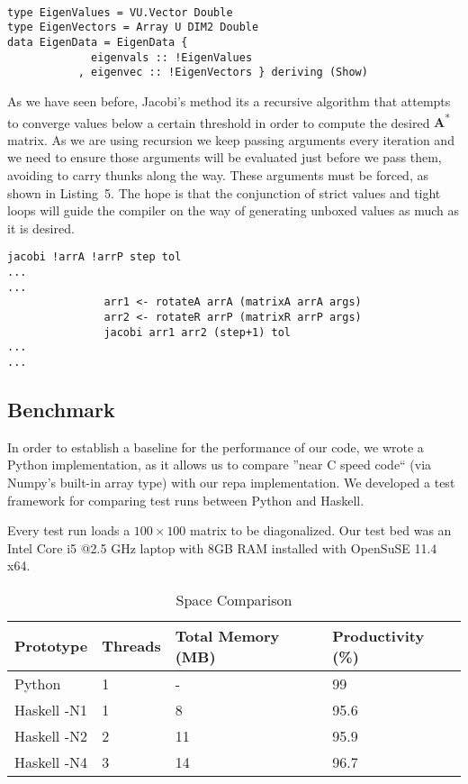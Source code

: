 \documentclass{tmr}
\begin{document}
\begin{lstlisting}[float,captionpos=b,belowcaptionskip=4pt, caption= Strict data types for eigenvalue operations]

type EigenValues = VU.Vector Double
type EigenVectors = Array U DIM2 Double
data EigenData = EigenData {
             eigenvals :: !EigenValues
           , eigenvec :: !EigenVectors } deriving (Show)

\end{lstlisting}

As we have seen before, Jacobi's method its a recursive algorithm that
attempts to converge values below a certain threshold in order to
compute the desired {\textbf A\textsuperscript{*}} matrix.  As we are
using recursion we keep passing arguments every iteration and we need to
ensure those arguments will be evaluated just before we pass them,
avoiding to carry thunks along the way. These arguments must be forced,
as shown in Listing~5. The hope is that the conjunction of strict values
and tight loops will guide the compiler on the way of generating unboxed values as much as it is desired.

\begin{lstlisting}[float,captionpos=b,belowcaptionskip=4pt, caption= Jacobi strict argument passing]
jacobi !arrA !arrP step tol
...
...
               arr1 <- rotateA arrA (matrixA arrA args)
               arr2 <- rotateR arrP (matrixR arrP args)
               jacobi arr1 arr2 (step+1) tol
...
...
\end{lstlisting}

\subsection{Benchmark}

In order to establish a baseline for the performance of our code, we
wrote a Python implementation, as it allows us to compare ''near C speed
code`` (via Numpy's built-in array type) with our repa implementation.
We developed a test framework for comparing test runs between Python and
Haskell.

Every test run loads a $100\times 100$ matrix to be diagonalized.  Our
test bed was an Intel Core i5 @2.5 GHz laptop with 8GB RAM installed
with OpenSuSE 11.4 x64.

\begin{table}[float,captionpos=b,belowcaptionskip=4pt]
\begin{center}
    \begin{tabular}{ l l l l }
Prototype & Threads & Total Memory (MB) & Productivity (\%) \\ 
\hline Python  & 1 & -  & 99   \\
Haskell -N1 & 1 & 8  & 95.6  \\
Haskell -N2 & 2 & 11 & 95.9  \\
Haskell -N4 & 3 & 14 & 96.7   \\
    \end{tabular} 
\end{center}
\label{tab:first}
\caption{Space Comparison}
\end{table}
\end{document}
